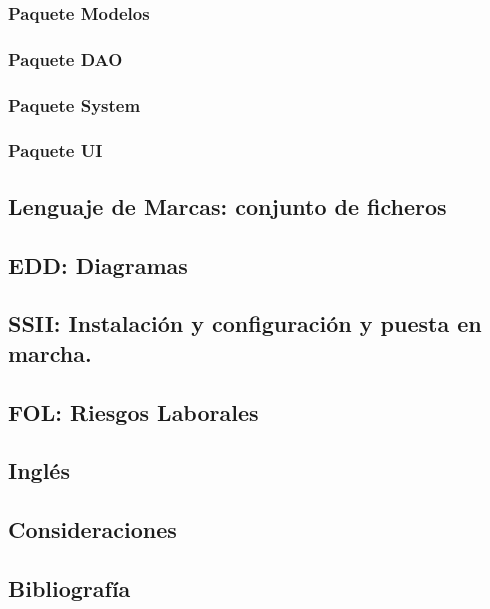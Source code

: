 \documentclass{article}
\begin{document}
\subsubsection{Paquete Modelos}

\subsubsection{Paquete DAO}

\subsubsection{Paquete System}

\subsubsection{Paquete UI}

\subsection{Lenguaje de Marcas: conjunto de ficheros}
\subsection{EDD: Diagramas}
\subsection{SSII: Instalación y configuración y puesta en marcha.}
\subsection{FOL: Riesgos Laborales}
\subsection{Inglés}
\subsection{Consideraciones}
\subsection{Bibliografía}
\end{document}
